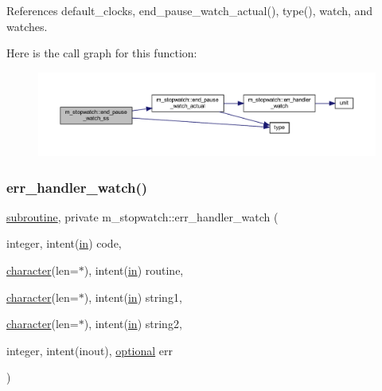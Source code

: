 References default\+\_\+clocks, end\+\_\+pause\+\_\+watch\+\_\+actual(), type(), watch, and watches.

Here is the call graph for this function\+:
\nopagebreak
\begin{figure}[H]
\begin{center}
\leavevmode
\includegraphics[width=350pt]{namespacem__stopwatch_a1aeced31682c43f2ead6efaf679cad8c_cgraph}
\end{center}
\end{figure}
\mbox{\label{namespacem__stopwatch_a8129c70e425409f9dc6666729f5b5c9c}} 
\subsubsection{\texorpdfstring{err\+\_\+handler\+\_\+watch()}{err\_handler\_watch()}}
{\footnotesize\ttfamily \hyperlink{M__stopwatch_83_8txt_acfbcff50169d691ff02d4a123ed70482}{subroutine}, private m\+\_\+stopwatch\+::err\+\_\+handler\+\_\+watch (\begin{DoxyParamCaption}\item[{integer, intent(\hyperlink{M__journal_83_8txt_afce72651d1eed785a2132bee863b2f38}{in})}]{code,  }\item[{\hyperlink{option__stopwatch_83_8txt_abd4b21fbbd175834027b5224bfe97e66}{character}(len=$\ast$), intent(\hyperlink{M__journal_83_8txt_afce72651d1eed785a2132bee863b2f38}{in})}]{routine,  }\item[{\hyperlink{option__stopwatch_83_8txt_abd4b21fbbd175834027b5224bfe97e66}{character}(len=$\ast$), intent(\hyperlink{M__journal_83_8txt_afce72651d1eed785a2132bee863b2f38}{in})}]{string1,  }\item[{\hyperlink{option__stopwatch_83_8txt_abd4b21fbbd175834027b5224bfe97e66}{character}(len=$\ast$), intent(\hyperlink{M__journal_83_8txt_afce72651d1eed785a2132bee863b2f38}{in})}]{string2,  }\item[{integer, intent(inout), \hyperlink{option__stopwatch_83_8txt_aa4ece75e7acf58a4843f70fe18c3ade5}{optional}}]{err }\end{DoxyParamCaption})\hspace{0.3cm}{\ttfamily [private]}}



